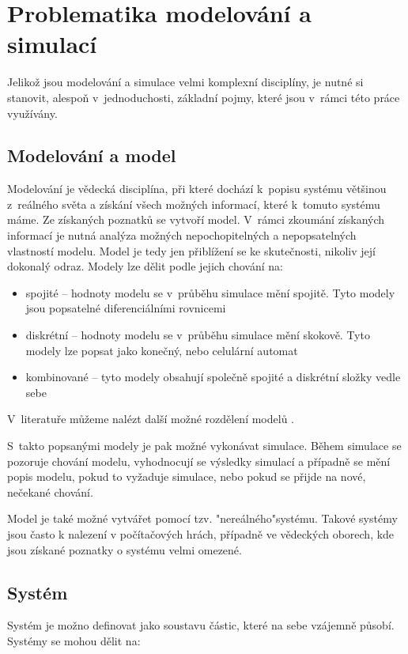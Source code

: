\section{Problematika modelování a simulací}
Jelikož jsou modelování a simulace velmi komplexní disciplíny, je nutné si stanovit, alespoň v~jednoduchosti, základní pojmy, které jsou v~rámci této práce využívány.

\subsection{Modelování a model}
\label{modelovani}
Modelování je vědecká disciplína, při které dochází k~popisu systému většinou z~reálného světa a získání všech možných informací, které k~tomuto systému máme. Ze získaných poznatků se vytvoří model. V~rámci zkoumání získaných informací je nutná analýza možných nepochopitelných a nepopsatelných vlastností modelu. Model je tedy jen přiblížení se ke skutečnosti, nikoliv její dokonalý odraz. Modely lze dělit podle jejich chování na:

\begin{itemize}
    \item spojité -- hodnoty modelu se v~průběhu simulace mění spojitě. Tyto modely jsou popsatelné diferenciálními rovnicemi
    \item diskrétní -- hodnoty modelu se v~průběhu simulace mění skokově. Tyto modely lze popsat jako konečný, nebo celulární automat
    \item kombinované -- tyto modely obsahují společně spojité a diskrétní složky vedle sebe
\end{itemize}

V~literatuře můžeme nalézt další možné rozdělení modelů \cite{IMS-skripta}.
\newline

S~takto popsanými modely je pak možné vykonávat simulace. Během simulace se pozoruje chování modelu, vyhodnocují se výsledky simulací a případně se mění popis modelu, pokud to vyžaduje simulace, nebo pokud se přijde na nové, nečekané chování.

Model je také možné vytvářet pomocí tzv. "nereálného"\space systému. Takové systémy jsou často k nalezení v počítačových hrách, případně ve vědeckých oborech, kde jsou získané poznatky o systému velmi omezené.

\subsection{Systém}
Systém je možno definovat jako soustavu částic, které na sebe vzájemně působí. Systémy se mohou dělit na:

